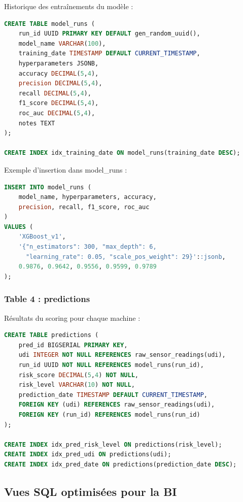 \documentclass[a4paper,12pt,twoside]{report}
\begin{document}
Historique des entraînements du modèle :

\begin{lstlisting}[language=sql]
CREATE TABLE model_runs (
    run_id UUID PRIMARY KEY DEFAULT gen_random_uuid(),
    model_name VARCHAR(100),
    training_date TIMESTAMP DEFAULT CURRENT_TIMESTAMP,
    hyperparameters JSONB,
    accuracy DECIMAL(5,4),
    precision DECIMAL(5,4),
    recall DECIMAL(5,4),
    f1_score DECIMAL(5,4),
    roc_auc DECIMAL(5,4),
    notes TEXT
);

CREATE INDEX idx_training_date ON model_runs(training_date DESC);
\end{lstlisting}

Exemple d'insertion dans model\_runs :

\begin{lstlisting}[language=sql]
INSERT INTO model_runs (
    model_name, hyperparameters, accuracy, 
    precision, recall, f1_score, roc_auc
)
VALUES (
    'XGBoost_v1',
    '{"n_estimators": 300, "max_depth": 6, 
      "learning_rate": 0.05, "scale_pos_weight": 29}'::jsonb,
    0.9876, 0.9642, 0.9556, 0.9599, 0.9789
);
\end{lstlisting}

\subsubsection{Table 4 : predictions}

Résultats du scoring pour chaque machine :

\begin{lstlisting}[language=sql]
CREATE TABLE predictions (
    pred_id BIGSERIAL PRIMARY KEY,
    udi INTEGER NOT NULL REFERENCES raw_sensor_readings(udi),
    run_id UUID NOT NULL REFERENCES model_runs(run_id),
    risk_score DECIMAL(5,4) NOT NULL,
    risk_level VARCHAR(10) NOT NULL,
    prediction_date TIMESTAMP DEFAULT CURRENT_TIMESTAMP,
    FOREIGN KEY (udi) REFERENCES raw_sensor_readings(udi),
    FOREIGN KEY (run_id) REFERENCES model_runs(run_id)
);

CREATE INDEX idx_pred_risk_level ON predictions(risk_level);
CREATE INDEX idx_pred_udi ON predictions(udi);
CREATE INDEX idx_pred_date ON predictions(prediction_date DESC);
\end{lstlisting}

\subsection{Vues SQL optimisées pour la BI}
\end{document}

